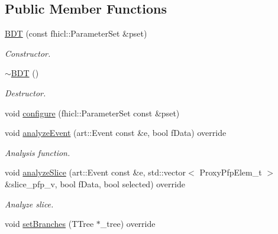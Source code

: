 \subsection*{Public Member Functions}
\begin{DoxyCompactItemize}
\item 
\hyperlink{classanalysis_1_1BDT_aa9f94ba60d96e98fd4b751988a08124c}{B\+DT} (const fhicl\+::\+Parameter\+Set \&pset)
\begin{DoxyCompactList}\small\item\em Constructor. \end{DoxyCompactList}\item 
\hyperlink{classanalysis_1_1BDT_ab6b0e7aa2281260856394e13903d6f21}{$\sim$\+B\+DT} ()\hypertarget{classanalysis_1_1BDT_ab6b0e7aa2281260856394e13903d6f21}{}\label{classanalysis_1_1BDT_ab6b0e7aa2281260856394e13903d6f21}

\begin{DoxyCompactList}\small\item\em Destructor. \end{DoxyCompactList}\item 
void \hyperlink{classanalysis_1_1BDT_a6605350a483110b5a866256f4edcec3c}{configure} (fhicl\+::\+Parameter\+Set const \&pset)
\item 
void \hyperlink{classanalysis_1_1BDT_abadae5b35cecaca0409c0ba659aa7b82}{analyze\+Event} (art\+::\+Event const \&e, bool f\+Data) override\hypertarget{classanalysis_1_1BDT_abadae5b35cecaca0409c0ba659aa7b82}{}\label{classanalysis_1_1BDT_abadae5b35cecaca0409c0ba659aa7b82}

\begin{DoxyCompactList}\small\item\em Analysis function. \end{DoxyCompactList}\item 
void \hyperlink{classanalysis_1_1BDT_ab31b4dac24b518a017d4a1898c76991d}{analyze\+Slice} (art\+::\+Event const \&e, std\+::vector$<$ Proxy\+Pfp\+Elem\+\_\+t $>$ \&slice\+\_\+pfp\+\_\+v, bool f\+Data, bool selected) override
\begin{DoxyCompactList}\small\item\em Analyze slice. \end{DoxyCompactList}\item 
void \hyperlink{classanalysis_1_1BDT_a2a849ddc24460a2e014b425c8ff17131}{set\+Branches} (T\+Tree $\ast$\+\_\+tree) override\hypertarget{classanalysis_1_1BDT_a2a849ddc24460a2e014b425c8ff17131}{}\label{classanalysis_1_1BDT_a2a849ddc24460a2e014b425c8ff17131}


\end{DoxyCompactItemize}
